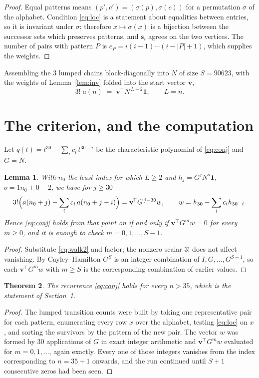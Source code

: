 \documentclass[11pt,a4paper]{article}
\theoremstyle{plain}
\newtheorem{theorem}{Theorem}
\newtheorem{lemma}[theorem]{Lemma}
\theoremstyle{definition}
\begin{document}
\begin{proof}
Equal patterns means $(p',c')=(\sigma(p),\sigma(c))$ for a permutation $\sigma$ of the
alphabet. Condition \eqref{eq:loc} is a statement about equalities between entries, so it is
invariant under $\sigma$; therefore $x\mapsto\sigma(x)$ is a bijection between the successor
sets which preserves patterns, and $\mathbf{s}_i$ agrees on the two vertices. The number of
pairs with pattern $P$ is $e_P=i(i-1)\cdots(i-|P|+1)$, which supplies the weights.
\end{proof}

Assembling the $3$ lumped chains block-diagonally into $N$ of size $S=90623$, with the
weights of Lemma~\ref{lem:inv} folded into the start vector $\mathbf{v}$,
\begin{equation}\label{eq:walk2}
3!\;a(n)\;=\;\mathbf{v}^{\!\top}N^{\,L-2}\mathbf{1},\qquad L=n .
\end{equation}

\section{The criterion, and the computation}

Let $q(t)=t^{30}-\sum_i c_i\,t^{30-i}$ be the characteristic polynomial of
\eqref{eq:conj} and $G=N$.

\begin{lemma}\label{lem:crit}
With $n_0$ the least index for which $L\ge2$ and $h_j=G^{j}N^{o}\mathbf{1}$,
$o=1n_0+0-2$, we have for $j\ge30$
\[
3!\Bigl(a(n_0+j)-\sum_i c_i\,a(n_0+j-i)\Bigr)
=\mathbf{v}^{\!\top}G^{\,j-30}w,\qquad
w=h_{30}-\sum_i c_i h_{30-i} .
\]
Hence \eqref{eq:conj} holds from that point on if and only if
$\mathbf{v}^{\!\top}G^{m}w=0$ for every $m\ge0$, and it is enough to check
$m=0,1,\dots,S-1$.
\end{lemma}

\begin{proof}
Substitute \eqref{eq:walk2} and factor; the nonzero scalar $3!$ does not affect
vanishing. By Cayley--Hamilton $G^{S}$ is an integer combination of $I,G,\dots,G^{S-1}$,
so each $\mathbf{v}^{\!\top}G^{m}w$ with $m\ge S$ is the corresponding combination of
earlier values.
\end{proof}

\begin{theorem}
The recurrence \eqref{eq:conj} holds for every $n>35$, which is the statement of
Section~1.
\end{theorem}

\begin{proof}
The lumped transition counts were built by taking one representative pair for each pattern,
enumerating every row $x$ over the alphabet, testing \eqref{eq:loc} on $x$, and sorting
the survivors by the pattern of the new pair. The vector $w$ was formed by $30$
applications of $G$ in exact integer arithmetic and $\mathbf{v}^{\!\top}G^{m}w$
evaluated for $m=0,1,\dots$, again exactly. Every one of those integers vanishes from the
index corresponding to $n=35+1$ onwards, and the run continued until $S+1$ consecutive
zeros had been seen.
\end{proof}
\end{document}

